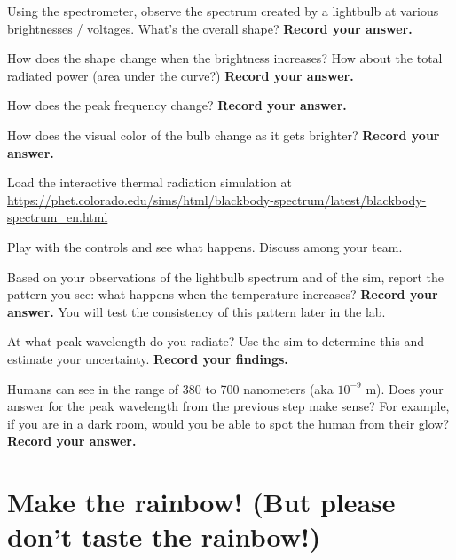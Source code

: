 \begin{steps}
	
	\item Using the spectrometer, observe the spectrum created by a lightbulb at various brightnesses / voltages.  What's the overall shape? \textbf{Record your answer.}
	
	\item How does the shape change when the brightness increases? How about the total radiated power (area under the curve?) \textbf{Record your answer.}
	
	\item How does the peak frequency change? \textbf{Record your answer.}
	
	\item How does the visual color of the bulb change as it gets brighter? \textbf{Record your answer.}

	\item \item\label{ic:step:load-sim} Load the interactive thermal radiation simulation
	at
	\url{https://phet.colorado.edu/sims/html/blackbody-spectrum/latest/blackbody-spectrum_en.html}
	
	\item Play with the controls and see what happens. Discuss among your team.
	
	\item\label{ic:step:pattern} Based on your observations of the lightbulb spectrum and of the sim, report the pattern you see: what happens when the temperature increases? \textbf{Record your answer.} You will test the consistency of this pattern later in the lab.
	
	\item At what peak wavelength do you radiate? Use the sim to determine this and 
	estimate your uncertainty. \textbf{Record your findings.}
	
	\item Humans can see in the range of 380 to 700 nanometers (aka $10^{-9}$ m). Does your answer for the peak wavelength from the previous step make sense? For example, if you are in a dark room, would you be able to spot the human from their glow? \textbf{Record your answer.}

\end{steps}

\section{Make the rainbow! (But please don't taste the rainbow!)}

